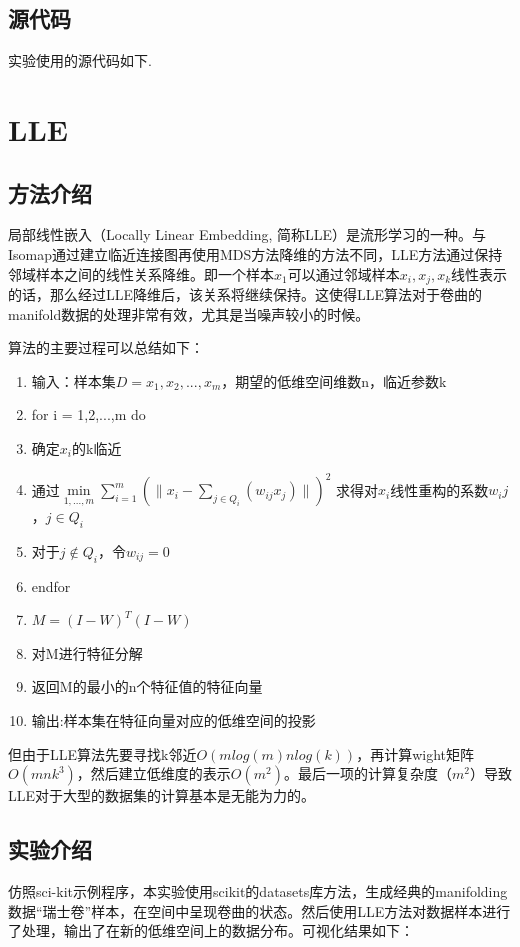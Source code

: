 \documentclass[UTF8]{ctexart}
\begin{document}
\subsection{源代码}
实验使用的源代码如下.  \vspace{5mm}
	
	\vspace{3mm}




\newpage
\section{LLE}
\subsection{方法介绍}
局部线性嵌入（Locally Linear Embedding, 简称LLE）是流形学习的一种。与Isomap通过建立临近连接图再使用MDS方法降维的方法不同，LLE方法通过保持邻域样本之间的线性关系降维。即一个样本$x_1$可以通过邻域样本$x_i,x_j,x_k$线性表示的话，那么经过LLE降维后，该关系将继续保持。这使得LLE算法对于卷曲的manifold数据的处理非常有效，尤其是当噪声较小的时候。\vspace{3mm}  

算法的主要过程可以总结如下：


\begin{enumerate}
	\item 输入：样本集$D={x_1,x_2,...,x_m}$，期望的低维空间维数n，临近参数k
	\item for i = 1,2,...,m do
	\item 确定$x_i$的k临近
	\item 通过$\min\limits_{1,...,m} \sum_{i = 1} ^m(\lVert x_i - \sum\limits_{j \in Q_i }(w_{ij}  x_j) \rVert)^2$ 求得对$x_i$线性重构的系数$w_ij$，$j \in Q_i$
	\item 对于$j \notin Q_i$，令$w_{ij}=0$
	\item endfor
	\item $M=(I-W)^T(I-W)$
	\item 对M进行特征分解
	\item 返回M的最小的n个特征值的特征向量
	\item 输出:样本集在特征向量对应的低维空间的投影
\end{enumerate}


但由于LLE算法先要寻找k邻近$O(mlog(m)nlog(k))$，再计算wight矩阵$O(mnk^3)$，然后建立低维度的表示$O(m^2)$。最后一项的计算复杂度$（m^2）$导致LLE对于大型的数据集的计算基本是无能为力的。
\subsection{实验介绍}
仿照sci-kit示例程序，本实验使用scikit的datasets库方法，生成经典的manifolding 数据“瑞士卷”样本，在空间中呈现卷曲的状态。然后使用LLE方法对数据样本进行了处理，输出了在新的低维空间上的数据分布。可视化结果如下：
\end{document}
